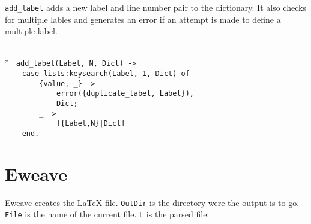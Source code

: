 \verb+add_label+ adds a new label and line number pair to the
dictionary. It also checks for multiple lables and generates an error
if an attempt is made to define a multiple label.

\begin{flushleft}
\label{analysis_6_6}
\\*
\tt
\noindent{}%
\verb&add_label(Label, N, Dict) ->&\\
\noindent{}%
\verb&    case lists:keysearch(Label, 1, Dict) of&\\
\noindent{}%
\verb&        {value, _} ->&\\
\noindent{}%
\verb&            error({duplicate_label, Label}),&\\
\noindent{}%
\verb&            Dict;&\\
\noindent{}%
\verb&        _ ->&\\
\noindent{}%
\verb&            [{Label,N}|Dict]&\\
\noindent{}%
\verb&    end.&\\
\end{flushleft}

\section*{Eweave}

Eweave creates the \LaTeX{} file. \verb+OutDir+ is the directory were
the output is to go. \verb+File+ is the name of the current file.
\verb+L+ is the parsed file:

